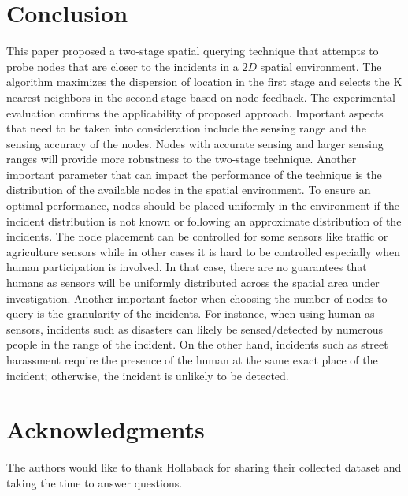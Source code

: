 \documentclass{acm_proc_article-sp}
\begin{document}
\section{Conclusion}
This paper proposed a two-stage spatial querying technique that attempts to probe nodes that are closer to the incidents in a $2D$ spatial environment. The algorithm maximizes the dispersion of location in the first stage and selects the K nearest neighbors in the second stage based on node feedback. The experimental evaluation confirms the applicability of proposed approach.
Important aspects that need to be taken into consideration include the sensing range and the sensing accuracy of the nodes. Nodes with accurate sensing and larger sensing ranges will provide more robustness to the two-stage technique. Another important parameter that can impact the performance of the technique is the distribution of the available nodes in the spatial environment. To ensure an optimal performance, nodes should be placed uniformly in the environment if the incident distribution is not known or following an approximate distribution of the incidents. The node placement can be controlled for some sensors like traffic or agriculture sensors while in other cases it is hard to be controlled especially when human participation is involved. In that case, there are no guarantees that humans as sensors will be uniformly distributed across the spatial area under investigation. Another important factor when choosing the number of nodes to query is the granularity of the incidents. For instance, when using human as sensors, incidents such as disasters can likely be sensed/detected by numerous people in the range of the incident. On the other hand, incidents such as street harassment require the presence of the human at the same exact place of the incident; otherwise, the incident is unlikely to be detected.

\section{Acknowledgments}
The authors would like to thank Hollaback for sharing their collected dataset and taking the time to answer questions.

{\footnotesize
}  %
%
%
\end{document}
